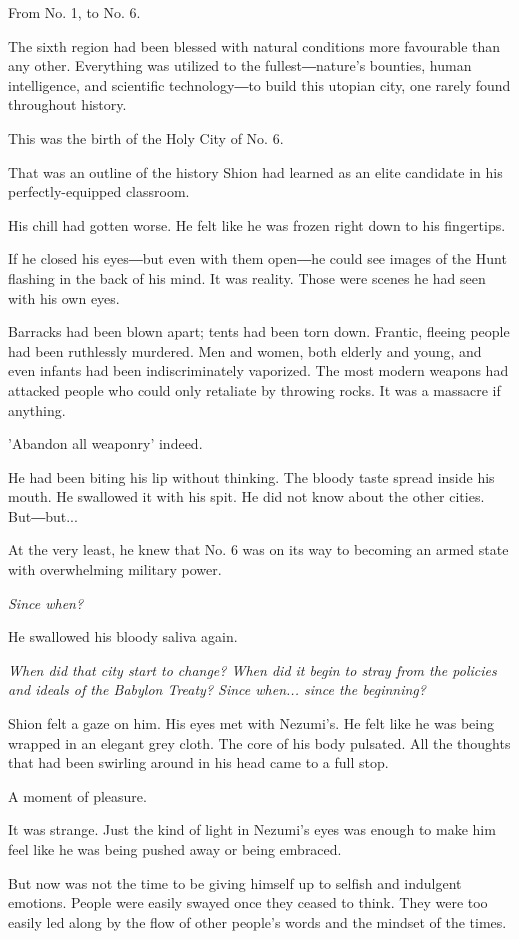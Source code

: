 From No. 1, to No. 6.

The sixth region had been blessed with natural conditions more
favourable than any other. Everything was utilized to the
fullest―nature's bounties, human intelligence, and scientific
technology―to build this utopian city, one rarely found throughout
history.

This was the birth of the Holy City of No. 6.

That was an outline of the history Shion had learned as an elite
candidate in his perfectly-equipped classroom.

His chill had gotten worse. He felt like he was frozen right down to his
fingertips.

If he closed his eyes―but even with them open―he could see images of the
Hunt flashing in the back of his mind. It was reality. Those were scenes
he had seen with his own eyes.

Barracks had been blown apart; tents had been torn down. Frantic,
fleeing people had been ruthlessly murdered. Men and women, both elderly
and young, and even infants had been indiscriminately vaporized. The
most modern weapons had attacked people who could only retaliate by
throwing rocks. It was a massacre if anything.

'Abandon all weaponry' indeed.

He had been biting his lip without thinking. The bloody taste spread
inside his mouth. He swallowed it with his spit. He did not know about
the other cities. But―but...

At the very least, he knew that No. 6 was on its way to becoming an
armed state with overwhelming military power.

\emph{Since when?}

He swallowed his bloody saliva again.

\emph{When did that city start to change? When did it begin to stray
from the policies and ideals of the Babylon Treaty? Since when... since
the beginning?}

Shion felt a gaze on him. His eyes met with Nezumi's. He felt like he
was being wrapped in an elegant grey cloth. The core of his body
pulsated. All the thoughts that had been swirling around in his head
came to a full stop.

A moment of pleasure.~

It was strange. Just the kind of light in Nezumi's eyes was enough to
make him feel like he was being pushed away or being embraced.

But now was not the time to be giving himself up to selfish and
indulgent emotions. People were easily swayed once they ceased to think.
They were too easily led along by the flow of other people's words and
the mindset of the times.

